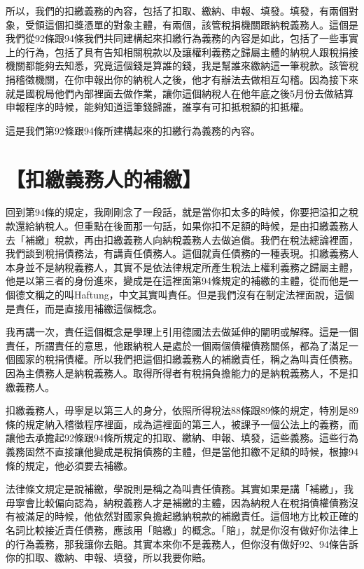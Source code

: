 \documentclass[]{ctexbook}
\begin{document}
所以，我們的扣繳義務的內容，包括了扣取、繳納、申報、填發。填發，有兩個對象，受領這個扣獎憑單的對象主體，有兩個，該管稅捐機關跟納稅義務人。這個是我們從92條跟94條我們共同建構起來扣繳行為義務的內容是如此，包括了一些事實上的行為，包括了具有告知相關稅款以及讓權利義務之歸屬主體的納稅人跟稅捐接機關都能夠去知悉，究竟這個錢是算誰的錢，我是幫誰來繳納這一筆稅款。該管稅捐稽徵機關，在你申報出你的納稅人之後，他才有辦法去做相互勾稽。因為接下來就是國稅局他們內部裡面去做作業，讓你這個納稅人在他年底之後5月份去做結算申報程序的時候，能夠知道這筆錢歸誰，誰享有可扣抵稅額的扣抵權。

這是我們第92條跟94條所建構起來的扣繳行為義務的內容。

\hypertarget{ux6263ux7e73ux7fa9ux52d9ux4ebaux7684ux88dcux7e73}{%
\section{【扣繳義務人的補繳】}\label{ux6263ux7e73ux7fa9ux52d9ux4ebaux7684ux88dcux7e73}}

回到第94條的規定，我剛剛念了一段話，就是當你扣太多的時候，你要把溢扣之稅款還給納稅人。但重點在後面那一句話，如果你扣不足額的時候，是由扣繳義務人去「補繳」稅款，再由扣繳義務人向納稅義務人去做追償。我們在稅法總論裡面，我們談到稅捐債務法，有講責任債務人。這個就責任債務的一種表現。扣繳義務人本身並不是納稅義務人，其實不是依法律規定所產生稅法上權利義務之歸屬主體，他是以第三者的身份進來，變成是在這裡面第94條規定的補繳的主體，從而他是一個德文稱之的叫Haftung，中文其實叫責任。但是我們沒有在制定法裡面說，這個是責任，而是直接用補繳這個概念。

我再講一次，責任這個概念是學理上引用德國法去做延伸的闡明或解釋。這是一個責任，所謂責任的意思，他跟納稅人是處於一個兩個債權債務關係，都為了滿足一個國家的稅捐債權。所以我們把這個扣繳義務人的補繳責任，稱之為叫責任債務。因為主債務人是納稅義務人。取得所得者有稅捐負擔能力的是納稅義務人，不是扣繳義務人。

扣繳義務人，毋寧是以第三人的身分，依照所得稅法88條跟89條的規定，特別是89條的規定納入稽徵程序裡面，成為這裡面的第三人，被課予一個公法上的義務，而讓他去承擔起92條跟94條所規定的扣取、繳納、申報、填發，這些義務。這些行為義務固然不直接讓他變成是稅捐債務的主體，但是當他扣繳不足額的時候，根據94條的規定，他必須要去補繳。

法律條文規定是說補繳，學說則是稱之為叫責任債務。其實如果是講「補繳」，我毋寧會比較偏向認為，納稅義務人才是補繳的主體，因為納稅人在稅捐債權債務沒有被滿足的時候，他依然對國家負擔起繳納稅款的補繳責任。這個地方比較正確的名詞比較接近責任債務，應該用「賠繳」的概念。「賠」，就是你沒有做好你法律上的行為義務，那我讓你去賠。其實本來你不是義務人，但你沒有做好92、94條告訴你的扣取、繳納、申報、填發，所以我要你賠。
\end{document}
